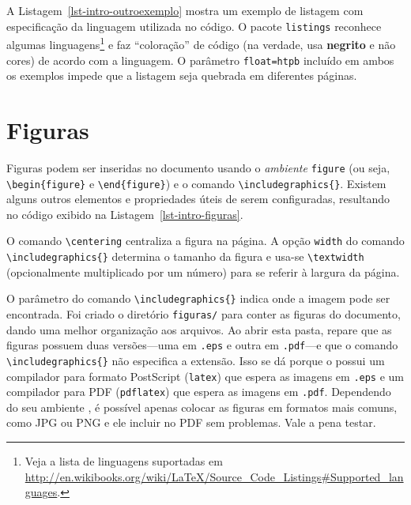 A Listagem~\ref{lst-intro-outroexemplo} mostra um exemplo de listagem com especificação da linguagem utilizada no código. O pacote \texttt{listings} reconhece algumas linguagens\footnote{Veja a lista de linguagens suportadas em \url{http://en.wikibooks.org/wiki/LaTeX/Source\_Code\_Listings\#Supported_languages}.} e faz ``coloração'' de código (na verdade, usa \textbf{negrito} e não cores) de acordo com a linguagem. O parâmetro \texttt{float=htpb} incluído em ambos os exemplos impede que a listagem seja quebrada em diferentes páginas.





\section{Figuras}
\label{sec-intro-figuras}

Figuras podem ser inseridas no documento usando o \emph{ambiente} \texttt{figure} (ou seja, \texttt{\textbackslash begin\{figure\}} e \texttt{\textbackslash end\{figure\}}) e o comando \texttt{\textbackslash includegraphics\{\}}. Existem alguns outros elementos e propriedades úteis de serem configuradas, resultando no código exibido na Listagem~\ref{lst-intro-figuras}.



O comando \texttt{\textbackslash centering} centraliza a figura na página. A opção \texttt{width} do comando \texttt{\textbackslash includegraphics\{\}} determina o tamanho da figura e usa-se \texttt{\textbackslash textwidth} (opcionalmente multiplicado por um número) para se referir à largura da página.

O parâmetro do comando \texttt{\textbackslash includegraphics\{\}} indica onde a imagem pode ser encontrada. Foi criado o diretório \texttt{figuras/} para conter as figuras do documento, dando uma melhor organização aos arquivos. Ao abrir esta pasta, repare que as figuras possuem duas versões---uma em \texttt{.eps} e outra em \texttt{.pdf}---e que o comando \texttt{\textbackslash includegraphics\{\}} não especifica a extensão. Isso se dá porque o \latex possui um compilador para formato PostScript (\texttt{latex}) que espera as imagens em \texttt{.eps} e um compilador para PDF (\texttt{pdflatex}) que espera as imagens em \texttt{.pdf}. Dependendo do seu ambiente \latex, é possível apenas colocar as figuras em formatos mais comuns, como JPG ou PNG e ele incluir no PDF sem problemas. Vale a pena testar.


